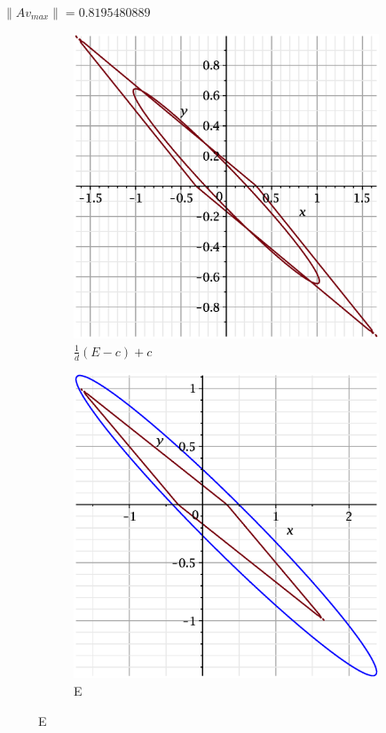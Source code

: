 \documentclass{beamer}
\begin{document}
\begin{frame}
$\|Av_{max}\| = 0.8195480889$  
    \begin{figure}
    \begin{subfigure}{.5\textwidth}
        \centering
        \includegraphics[width=.8\linewidth]{pictures/9.eps}
        \caption{$\displaystyle\frac{1}{d}(E-c)+c$}
    \label{fig:sfig1}
    \end{subfigure}%
    \begin{subfigure}{.5\textwidth}
        \centering
        \includegraphics[width=.8\linewidth]{pictures/1_9.eps}
        \caption{E}
    \label{fig:sfig2}
    \end{subfigure}
\end{figure}

\end{frame}
\end{document}
